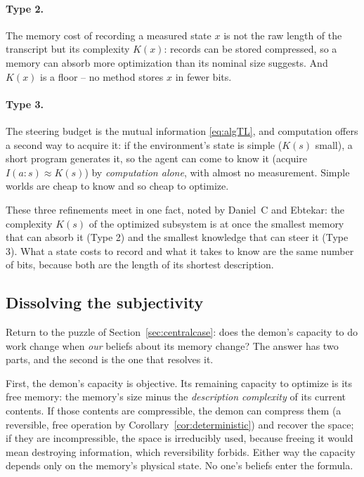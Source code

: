 \documentclass[10pt]{article}
\theoremstyle{definition}
\theoremstyle{remark}
\begin{document}
\paragraph{Type 2.} The memory cost of recording a measured state $x$ is not the raw length of the transcript but its complexity $K(x)$: records can be stored compressed, so a memory can absorb more optimization than its nominal size suggests. And $K(x)$ is a floor -- no method stores $x$ in fewer bits.

\paragraph{Type 3.} The steering budget is the mutual information \eqref{eq:algTL}, and computation offers a second way to acquire it: if the environment's state is simple ($K(s)$ small), a short program generates it, so the agent can come to know it (acquire $I(a:s) \approx K(s)$) by \emph{computation alone}, with almost no measurement. Simple worlds are cheap to know and so cheap to optimize.

These three refinements meet in one fact, noted by Daniel~C and Ebtekar: the complexity $K(s)$ of the optimized subsystem is at once the smallest memory that can absorb it (Type 2) and the smallest knowledge that can steer it (Type 3). What a state costs to record and what it takes to know are the same number of bits, because both are the length of its shortest description.

\subsection{Dissolving the subjectivity}
\label{sec:dissolve}

Return to the puzzle of Section~\ref{sec:centralcase}: does the demon's capacity to do work change when \emph{our} beliefs about its memory change? The answer has two parts, and the second is the one that resolves it.

First, the demon's capacity is objective. Its remaining capacity to optimize is its free memory: the memory's size minus the \emph{description complexity} of its current contents. If those contents are compressible, the demon can compress them (a reversible, free operation by Corollary~\ref{cor:deterministic}) and recover the space; if they are incompressible, the space is irreducibly used, because freeing it would mean destroying information, which reversibility forbids. Either way the capacity depends only on the memory's physical state. No one's beliefs enter the formula.
\end{document}
